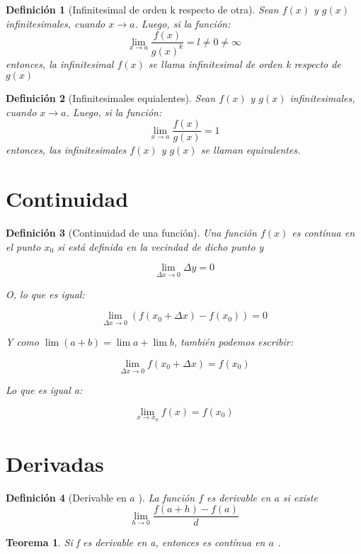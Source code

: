 \message{ !name(analisis-mat.tex)}\documentclass[12pt,a4paper]{article}
\newtheorem{mydef}{Definici\'on}[section]
\newtheorem{theorem}{Teorema}[section]
\begin{document}
\begin{mydef}[Infinitesimal de orden k respecto de otra]
Sean $f(x)$ y $g(x)$ infinitesimales, cuando $x \to a$. Luego, si la
funci\'on:
\[\lim_{x \to a}\frac{f(x)}{g(x)^k}=l\neq0\neq\infty\]
entonces, la infinitesimal $f(x)$ se llama \emph{infinitesimal de
  orden k respecto de} $g(x)$
\end{mydef}


\begin{mydef}[Infinitesimales equialentes]
Sean $f(x)$ y $g(x)$ infinitesimales, cuando $x \to a$. Luego, si la
funci\'on:
\[\lim_{x \to a}\frac{f(x)}{g(x)}=1\]
entonces, las infinitesimales $f(x)$ y $g(x)$ se llaman
\emph{equivalentes}.
\end{mydef}

\section{Continuidad}

\begin{mydef}[Continuidad de una funci\'on]

Una funci\'on \( f(x) \) es \emph{cont\'inua} en el punto \( x_0 \) si
est\'a definida en la vecindad de dicho punto y

\[ \lim_{\Delta x \to 0} \Delta y = 0 \]

O, lo que es igual:


\[ \lim_{\Delta x \to 0} (f(x_0+\Delta x)-f(x_0)) = 0 \]

Y como \( \lim(a+b) = \lim a + \lim b \), tambi\'en podemos escribir:

\[ \lim_{\Delta x \to 0} f(x_0+ \Delta x) = f(x_0) \]

Lo que es igual a:

\[ \lim_{x \to x_0} f(x) = f(x_0) \]



\end{mydef}

\section{Derivadas}

\begin{mydef}[Derivable en \( a \) ]
La funci\'on \( f \) es \emph{derivable en} \( a \)  si existe
\[ \lim_{h \to 0} \frac{f(a+h)-f(a)}{d} \] 
\end{mydef}

\begin{theorem}
Si f es derivable en a, entonces es cont\'inua en \( a \) .
\end{theorem}
\end{document}
